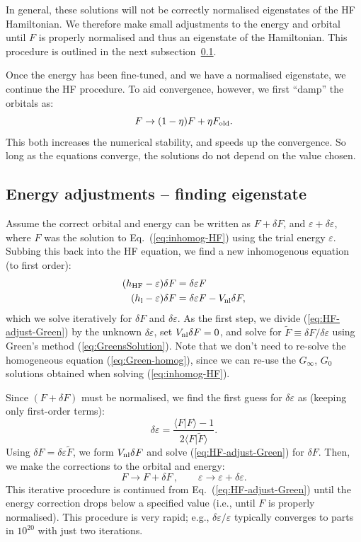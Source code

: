 \documentclass[10pt,twocolumn,a4paper]{article}%
\newcommand{\braket}[1]{\ensuremath{\langle #1\rangle}}	%
\newcommand{\be}{\begin{equation}}
\newcommand{\ee}{\end{equation}}
\def\en{\ensuremath{\varepsilon}}
\begin{document}
In general, these solutions will not be correctly normalised eigenstates of the HF Hamiltonian.
We therefore make small adjustments to the energy and orbital until $F$ is properly normalised and thus an eigenstate of the Hamiltonian.
This procedure is outlined in the next subsection~\ref{sec:hf-adjustEn}.

Once the energy has been fine-tuned, and we have a normalised eigenstate, we continue the HF procedure.
To aid convergence, however, we first ``damp'' the orbitals as:
\be
F \to (1-\eta)F+ \eta F_{\rm old}.
\ee
This both increases the numerical stability, and speeds up the convergence.
So long as the equations converge, the solutions do not depend on the value chosen.



\subsection{Energy adjustments -- finding eigenstate}\label{sec:hf-adjustEn}




Assume the correct orbital and energy can be written as
$F +  \delta F$, and
$\en + \delta\en $,
where $F$ was the solution to Eq.~(\ref{eq:inhomog-HF}) using the trial energy $\en$.
Subbing this back into the HF equation, we find a new inhomogenous equation (to first order):
\begin{align}
(h_{\rm HF} - \en) \delta F &=  \delta\en F  \\
(h_{\rm l} - \en) \delta F &=  \delta\en F  - V_{\rm nl} \delta F,  \label{eq:HF-adjust-Green}
\end{align}
which we solve iteratively for $\delta F$ and $\delta \en$.
As the first step, we divide (\ref{eq:HF-adjust-Green}) by the unknown $\delta\en$, set $V_{\rm nl} \delta F=0$, and solve for $\tilde F\equiv\delta F/\delta\en$ using Green's method (\ref{eq:GreensSolution}).
Note that we don't need to re-solve the homogeneous equation (\ref{eq:Green-homog}), since we can re-use the $G_\infty$, $G_0$
solutions obtained when solving (\ref{eq:inhomog-HF}).

Since $(F+\delta F)$ must be normalised, we find the first guess for $\delta \en$ as (keeping only first-order terms):
\be
\delta \en = \frac{\braket{F|F} - 1}{2\braket{F|\tilde F}}.
\ee
Using  $\delta F = \delta\en\tilde F$, we form $V_{\rm nl} \delta F$ and solve (\ref{eq:HF-adjust-Green}) for $\delta F$.
Then, we make the corrections to the orbital and energy:
\be
F\to F+\delta F \, , \qquad \en\to\en + \delta\en.
\ee
This iterative procedure is continued from Eq.~(\ref{eq:HF-adjust-Green}) until the energy correction drops below a specified value
(i.e., until $F$ is properly normalised).
This procedure is very rapid; e.g., $\delta\en/\en$ typically converges to parts in $10^{20}$ with just two iterations.
\end{document}
